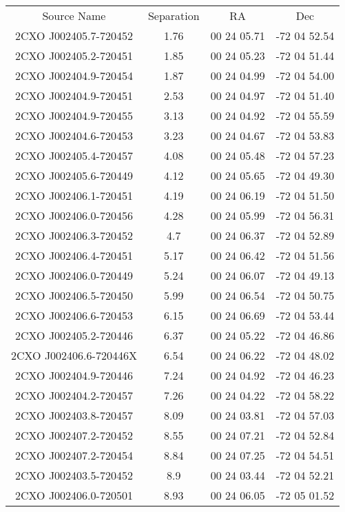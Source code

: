 \begin{table}
\begin{tabular}{cccc}
Source Name & Separation & RA & Dec \\
2CXO J002405.7-720452 & 1.76 & 00 24 05.71 & -72 04 52.54 \\
2CXO J002405.2-720451 & 1.85 & 00 24 05.23 & -72 04 51.44 \\
2CXO J002404.9-720454 & 1.87 & 00 24 04.99 & -72 04 54.00 \\
2CXO J002404.9-720451 & 2.53 & 00 24 04.97 & -72 04 51.40 \\
2CXO J002404.9-720455 & 3.13 & 00 24 04.92 & -72 04 55.59 \\
2CXO J002404.6-720453 & 3.23 & 00 24 04.67 & -72 04 53.83 \\
2CXO J002405.4-720457 & 4.08 & 00 24 05.48 & -72 04 57.23 \\
2CXO J002405.6-720449 & 4.12 & 00 24 05.65 & -72 04 49.30 \\
2CXO J002406.1-720451 & 4.19 & 00 24 06.19 & -72 04 51.50 \\
2CXO J002406.0-720456 & 4.28 & 00 24 05.99 & -72 04 56.31 \\
2CXO J002406.3-720452 & 4.7 & 00 24 06.37 & -72 04 52.89 \\
2CXO J002406.4-720451 & 5.17 & 00 24 06.42 & -72 04 51.56 \\
2CXO J002406.0-720449 & 5.24 & 00 24 06.07 & -72 04 49.13 \\
2CXO J002406.5-720450 & 5.99 & 00 24 06.54 & -72 04 50.75 \\
2CXO J002406.6-720453 & 6.15 & 00 24 06.69 & -72 04 53.44 \\
2CXO J002405.2-720446 & 6.37 & 00 24 05.22 & -72 04 46.86 \\
2CXO J002406.6-720446X & 6.54 & 00 24 06.22 & -72 04 48.02 \\
2CXO J002404.9-720446 & 7.24 & 00 24 04.92 & -72 04 46.23 \\
2CXO J002404.2-720457 & 7.26 & 00 24 04.22 & -72 04 58.22 \\
2CXO J002403.8-720457 & 8.09 & 00 24 03.81 & -72 04 57.03 \\
2CXO J002407.2-720452 & 8.55 & 00 24 07.21 & -72 04 52.84 \\
2CXO J002407.2-720454 & 8.84 & 00 24 07.25 & -72 04 54.51 \\
2CXO J002403.5-720452 & 8.9 & 00 24 03.44 & -72 04 52.21 \\
2CXO J002406.0-720501 & 8.93 & 00 24 06.05 & -72 05 01.52 \\

\end{tabular}
\end{table}
